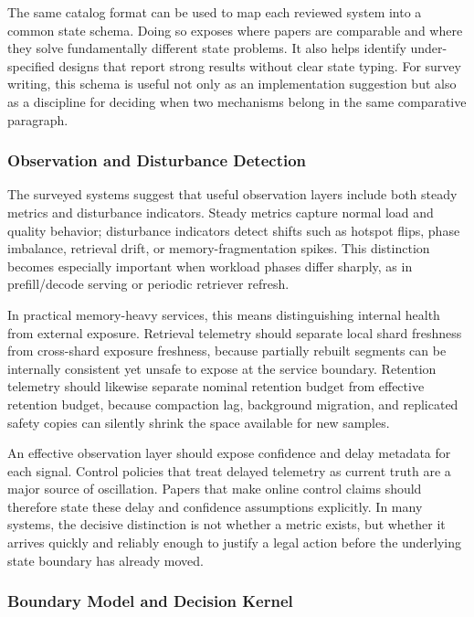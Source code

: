 \documentclass[acmsmall,screen,review]{acmart}
\begin{document}
The same catalog format can be used to map each reviewed system into a common state schema. Doing so exposes where papers are comparable and where they solve fundamentally different state problems. It also helps identify under-specified designs that report strong results without clear state typing. For survey writing, this schema is useful not only as an implementation suggestion but also as a discipline for deciding when two mechanisms belong in the same comparative paragraph.

\subsubsection{Observation and Disturbance Detection}

The surveyed systems suggest that useful observation layers include both steady metrics and disturbance indicators. Steady metrics capture normal load and quality behavior; disturbance indicators detect shifts such as hotspot flips, phase imbalance, retrieval drift, or memory-fragmentation spikes. This distinction becomes especially important when workload phases differ sharply, as in prefill/decode serving or periodic retriever refresh.

In practical memory-heavy services, this means distinguishing internal health from external exposure. Retrieval telemetry should separate local shard freshness from cross-shard exposure freshness, because partially rebuilt segments can be internally consistent yet unsafe to expose at the service boundary. Retention telemetry should likewise separate nominal retention budget from effective retention budget, because compaction lag, background migration, and replicated safety copies can silently shrink the space available for new samples.

An effective observation layer should expose confidence and delay metadata for each signal. Control policies that treat delayed telemetry as current truth are a major source of oscillation. Papers that make online control claims should therefore state these delay and confidence assumptions explicitly. In many systems, the decisive distinction is not whether a metric exists, but whether it arrives quickly and reliably enough to justify a legal action before the underlying state boundary has already moved.

\subsubsection{Boundary Model and Decision Kernel}
\end{document}
